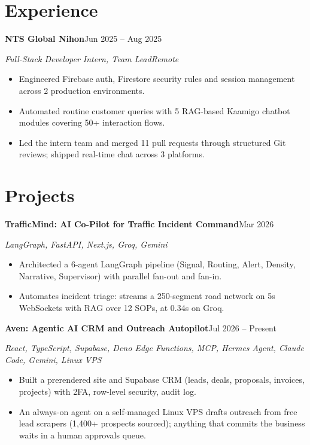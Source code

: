 \documentclass[a4paper,9pt]{extarticle}
\newcommand{\entry}[2]{%
  \textbf{#1}\hfill{\small #2}\par\vspace{1pt}}
\newcommand{\sub}[2]{%
  {\small\itshape #1}\hfill{\small\itshape #2}\par\vspace{2pt}}
\begin{document}
\section{Experience}
\entry{NTS Global Nihon}{Jun 2025 -- Aug 2025}
\sub{Full-Stack Developer Intern, Team Lead}{Remote}
\begin{itemize}
  \item Engineered Firebase auth, Firestore security rules and session management across 2 production environments.
  \item Automated routine customer queries with 5 RAG-based Kaamigo chatbot modules covering 50+ interaction flows.
  \item Led the intern team and merged 11 pull requests through structured Git reviews; shipped real-time chat across 3 platforms.
\end{itemize}

\section{Projects}

\entry{TrafficMind: AI Co-Pilot for Traffic Incident Command}{Mar 2026}
\sub{LangGraph, FastAPI, Next.js, Groq, Gemini}{}
\begin{itemize}
  \item Architected a 6-agent LangGraph pipeline (Signal, Routing, Alert, Density, Narrative, Supervisor) with parallel fan-out and fan-in.
  \item Automates incident triage: streams a 250-segment road network on 5s WebSockets with RAG over 12 SOPs, at 0.34s on Groq.
\end{itemize}

\entry{Aven: Agentic AI CRM and Outreach Autopilot}{Jul 2026 -- Present}
\sub{React, TypeScript, Supabase, Deno Edge Functions, MCP, Hermes Agent, Claude Code, Gemini, Linux VPS}{}
\begin{itemize}
  \item Built a prerendered site and Supabase CRM (leads, deals, proposals, invoices, projects) with 2FA, row-level security, audit log.
  \item An always-on agent on a self-managed Linux VPS drafts outreach from free lead scrapers (1,400+ prospects sourced); anything that commits the business waits in a human approvals queue.
\end{itemize}
\end{document}
